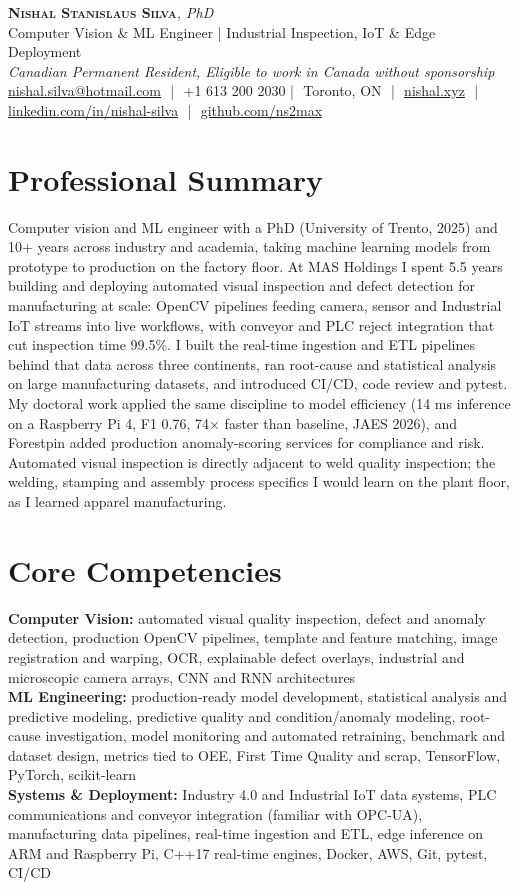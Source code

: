 \documentclass[11pt]{article}
\makeatletter
\newcommand{\cvName}{Nishal Stanislaus Silva}
\newcommand{\cvEmail}{nishal.silva@hotmail.com}
\newcommand{\cvPhone}{+1 613 200 2030}
\newcommand{\cvCity}{Toronto, ON}
\newcommand{\cvSite}{https://nishal.xyz}
\newcommand{\cvLinkedIn}{https://www.linkedin.com/in/nishal-silva}
\newcommand{\cvGitHub}{https://github.com/ns2max}
\newcommand{\cvStatus}{Canadian Permanent Resident, Eligible to work in Canada without sponsorship}
\newcommand{\cvTagline}{Computer Vision \& ML Engineer | Industrial Inspection, IoT \& Edge Deployment}
\makeatother
\begin{document}
\pagestyle{empty}
\begin{center}
    {\LARGE \scshape \textbf{\cvName}}{\large \textit{, PhD}}\\[1pt]
    {\small \cvTagline}\\[1pt]
    {\footnotesize\textit{\cvStatus}}\\[1pt]
    {\small
    \href{mailto:\cvEmail}{\cvEmail} \,\,|\,\, \cvPhone \,\,|\,\, \cvCity
    \,\,|\,\, \href{\cvSite}{nishal.xyz} \,\,|\,\, \href{\cvLinkedIn}{linkedin.com/in/nishal-silva}
    \,\,|\,\, \href{\cvGitHub}{github.com/ns2max}}
\end{center}

\section*{Professional Summary}

Computer vision and ML engineer with a PhD (University of Trento, 2025) and 10+ years across industry and academia, taking machine learning models from prototype to production on the factory floor. At MAS Holdings I spent 5.5 years building and deploying automated visual inspection and defect detection for manufacturing at scale: OpenCV pipelines feeding camera, sensor and Industrial IoT streams into live workflows, with conveyor and PLC reject integration that cut inspection time 99.5\%. I built the real-time ingestion and ETL pipelines behind that data across three continents, ran root-cause and statistical analysis on large manufacturing datasets, and introduced CI/CD, code review and pytest. My doctoral work applied the same discipline to model efficiency (14 ms inference on a Raspberry Pi 4, F1 0.76, 74$\times$ faster than baseline, JAES 2026), and Forestpin added production anomaly-scoring services for compliance and risk. Automated visual inspection is directly adjacent to weld quality inspection; the welding, stamping and assembly process specifics I would learn on the plant floor, as I learned apparel manufacturing.

\section*{Core Competencies}

\textbf{Computer Vision:} automated visual quality inspection, defect and anomaly detection, production OpenCV pipelines, template and feature matching, image registration and warping, OCR, explainable defect overlays, industrial and microscopic camera arrays, CNN and RNN architectures\\
\textbf{ML Engineering:} production-ready model development, statistical analysis and predictive modeling, predictive quality and condition/anomaly modeling, root-cause investigation, model monitoring and automated retraining, benchmark and dataset design, metrics tied to OEE, First Time Quality and scrap, TensorFlow, PyTorch, scikit-learn\\
\textbf{Systems \& Deployment:} Industry 4.0 and Industrial IoT data systems, PLC communications and conveyor integration (familiar with OPC-UA), manufacturing data pipelines, real-time ingestion and ETL, edge inference on ARM and Raspberry Pi, C++17 real-time engines, Docker, AWS, Git, pytest, CI/CD
\end{document}

